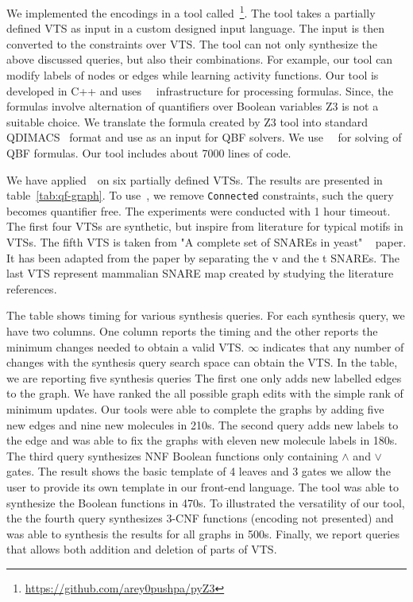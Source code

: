 We implemented the encodings in a tool
called~\ourtool\footnote{{\url{https://github.com/arey0pushpa/pyZ3}}}.
%
The tool takes a partially defined VTS as input in a custom designed
input language.
%
The input is then converted to the constraints over VTS. 
%
The tool can not only synthesize the above discussed queries, but also their
combinations.
%
For example, our tool can modify labels of nodes or edges while
learning activity functions.
%
Our tool is developed in C++ and uses~\zthree~\cite{z3} infrastructure for
processing formulas. 
%
Since, the formulas involve alternation of quantifiers over Boolean
variables Z3 is not a suitable choice.
%
We translate the formula created by Z3 tool into standard
QDIMACS~\cite{qdimacs} format and use as an input for QBF solvers. 
%
We use~\depqbf~\cite{lonsing2010depqbf} for solving of QBF formulas. 
%
Our tool includes about 7000 lines of code.

We have applied~\ourtool~on six partially defined VTSs.
%
The results are presented in table~\ref{tab:qf-graph}.
%
To use~\zthree, we remove \texttt{Connected} constraints, such the query becomes
quantifier free.
%
%
The experiments were conducted with 1 hour timeout.
%
The first four VTSs are synthetic, but inspire from literature for
typical motifs in VTSs. 
%
%
The fifth VTS is taken from "A complete set of SNAREs in yeast"
~\cite{burri2004complete} paper. It has been adapted from the paper by
separating the v and the t SNAREs. 
%
The last VTS represent mammalian SNARE map created by studying the literature references.  

The table shows timing for various synthesis queries.
%
For each synthesis query, we have two columns.
%
One column reports the timing and the other reports the minimum changes
needed to obtain a valid VTS.
%
$\infty$ indicates that any number of changes with the synthesis query
search space can obtain the VTS.
%
In the table, we are reporting five synthesis queries
%
The first one only adds new labelled edges to the graph.
%
We have ranked the all possible graph edits with the simple rank of
minimum updates.
%
Our tools were able to complete the graphs by adding five new edges
and nine new molecules in 210s.
%
The second query adds new labels to the edge and was able to
fix the graphs with eleven new molecule labels in 180s.
%
The third query synthesizes NNF Boolean functions only containing
$\land$ and $\lor$ gates.
%
The result shows the basic template of 4 leaves and 3 gates we allow
the user to provide its own template in our front-end language.
%
The tool was able to synthesize the Boolean functions in 470s.
%
To illustrated the versatility of our tool,
the the fourth query synthesizes $3$-CNF functions (encoding not presented) and was able
to synthesis the results for all graphs in 500s.
%
Finally, we report queries that allows both addition and deletion of parts of
VTS. 
%
%


